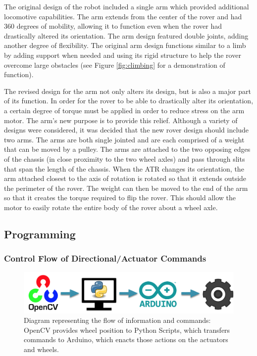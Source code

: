 \documentclass[12pt]{article}
\numberwithin{figure}{section}
\begin{document}
\begin{multicols}{2}
The original design of the robot included a single arm which provided additional locomotive capabilities. The arm extends from the center of the rover and had 360 degrees of mobility, allowing it to function even when the rover had drastically altered its orientation. The arm design featured double joints, adding another degree of flexibility. The original arm design functions similar to a limb by adding support when needed and using its rigid structure to help the rover overcome large obstacles (see Figure \ref{fig:climbing} for a demonstration of function). 

The revised design for the arm not only alters its design, but is also a major part of its function. In order for the rover to be able to drastically alter its orientation, a certain degree of torque must be applied in order to reduce stress on the arm motor. The arm’s new purpose is to provide this relief. Although a variety of designs were considered, it was decided that the new rover design should include two arms. The arms are both single jointed and are each comprised of a weight that can be moved by a pulley. The arms are attached to the two opposing edges of the chassis (in close proximity to the two wheel axles) and  pass through slits that span the length of the chassis. When the ATR changes its orientation, the arm attached closest to the axis of rotation is rotated so that it extends outside the perimeter of the rover. The weight can then be moved to the end of the arm so that it creates the torque required to flip the rover. This should allow the motor to easily rotate the entire body of the rover about a wheel axle. 

\subsection{Programming}
\subsubsection{Control Flow of Directional/Actuator Commands}
\begin{figure}[H]
\includegraphics[scale=0.15]{Programming_Flowchart.png}
\caption{Diagram representing the flow of information and commands: OpenCV provides wheel position to Python Scripts, which transfers commands to Arduino, which enacts those actions on the actuators and wheels.}
\label{fig:flowchart}
\end{figure}


\end{multicols}
\end{document}
